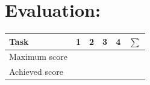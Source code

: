 \section*{\hspace*{2mm}Evaluation:}
\begin{center}
	\begin{tabular}{p{4cm}P{1.0cm}P{1.0cm}P{1.0cm}P{1.0cm}P{1.0cm}}
		\toprule
		Task           & 1                   & 2                   & 3                   & 4                   & $\sum$                                                                                              \\
		\midrule
		Maximum score  &  &  &  &  &  \\
		Achieved score &                                                                                                                                                                                             \\
		\bottomrule
	\end{tabular}
\end{center}